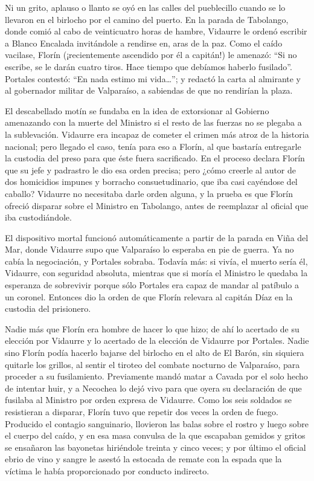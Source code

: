 \documentclass[10pt,twoside,openright]{memoir}
\begin{document}
Ni un grito, aplauso o llanto se oyó en las calles del pueblecillo
cuando se lo llevaron en el birlocho por el camino del puerto. En la
parada de Tabolango, donde comió al cabo de veinticuatro horas de
hambre, Vidaurre le ordenó escribir a Blanco Encalada invitándole a
rendirse en, aras de la paz. Como el caído vacilase, Florín
(¡recientemente ascendido por él a capitán!) le amenazó: ``Si no escribe,
se le darán cuatro tiros. Hace tiempo que debíamos haberlo fusilado''.
Portales contestó: ``En nada estimo mi vida\ldots''; y redactó la carta al
almirante y al gobernador militar de Valparaíso, a sabiendas de que no
rendirían la plaza.

El descabellado motín se fundaba en la idea de extorsionar al Gobierno
amenazando con la muerte del Ministro si el resto de las fuerzas no se
plegaba a la sublevación. Vidaurre era incapaz de cometer el crimen más
atroz de la historia nacional; pero llegado el caso, tenía para eso a
Florín, al que bastaría entregarle la custodia del preso para que éste
fuera sacrificado. En el proceso declara Florín que su jefe y padrastro
le dio esa orden precisa; pero ¿cómo creerle al autor de dos homicidios
impunes y borracho consuetudinario, que iba casi cayéndose del caballo?
Vidaurre no necesitaba darle orden alguna, y la prueba es que Florín
ofreció disparar sobre el Ministro en Tabolango, antes de reemplazar al
oficial que iba custodiándole.

El dispositivo mortal funcionó automáticamente a partir de la parada en
Viña del Mar, donde Vidaurre supo que Valparaíso lo esperaba en pie de
guerra. Ya no cabía la negociación, y Portales sobraba. Todavía más: si
vivía, el muerto sería él, Vidaurre, con seguridad absoluta, mientras
que si moría el Ministro le quedaba la esperanza de sobrevivir porque
sólo Portales era capaz de mandar al patíbulo a un coronel. Entonces dio
la orden de que Florín relevara al capitán Díaz en la custodia del
prisionero.

Nadie más que Florín era hombre de hacer lo que hizo; de ahí lo acertado
de su elección por Vidaurre y lo acertado de la elección de Vidaurre por
Portales. Nadie sino Florín podía hacerlo bajarse del birlocho en el
alto de El Barón, sin siquiera quitarle los grillos, al sentir el
tiroteo del combate nocturno de Valparaíso, para proceder a su
fusilamiento. Previamente mandó matar a Cavada por el solo hecho de
intentar huir, y a Necochea lo dejó vivo para que oyera su declaración
de que fusilaba al Ministro por orden expresa de Vidaurre. Como los seis
soldados se resistieran a disparar, Florín tuvo que repetir dos veces la
orden de fuego. Producido el contagio sanguinario, llovieron las balas
sobre el rostro y luego sobre el cuerpo del caído, y en esa masa
convulsa de la que escapaban gemidos y gritos se ensañaron las bayonetas
hiriéndole treinta y cinco veces; y por último el oficial ebrio de vino
y sangre le asestó la estocada de remate con la espada que la víctima le
había proporcionado por conducto indirecto.
\end{document}
